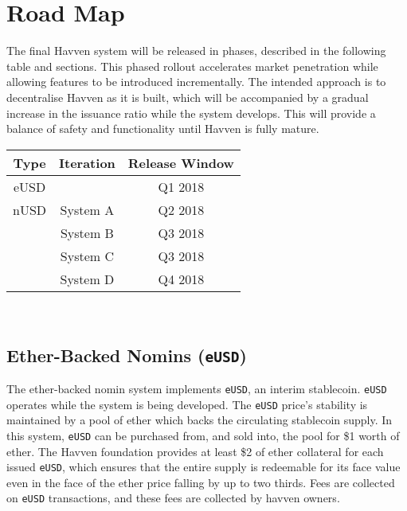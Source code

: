 \section{Road Map}

The final Havven system will be released in phases, described in the following
table and sections. This phased rollout accelerates market penetration while
allowing features to be introduced incrementally. The intended approach  
is to decentralise Havven as it is built, which will be accompanied by a gradual
increase in the issuance ratio while the system develops.
This will provide a balance of safety and functionality until Havven is fully
mature. \\

\vspace{0.5cm}
\renewcommand{\arraystretch}{1.5}
\setlength{\tabcolsep}{20pt}
\begin{centering}
    \begin{tabular}{|c|c|c|}
        \hline
        \textbf{Type} & \textbf{Iteration} & \textbf{Release Window} \\
        \hline
        \hline
        eUSD & & Q1 2018 \\
        \hline
        \hline
        nUSD & System A & Q2 2018 \\ \cline{2-3}
        & System B & Q3 2018 \\ \cline{2-3}
        & System C & Q3 2018 \\ \cline{2-3}
        & System D & Q4 2018 \\
        \hline
    \end{tabular} \\
\end{centering}

\vspace{0.5cm}

\subsection{Ether-Backed Nomins (\texttt{eUSD})}

\noindent The ether-backed nomin system implements \texttt{eUSD}, an interim stablecoin.
\texttt{eUSD} operates while the system is being developed.
The \texttt{eUSD} price's stability is maintained by a pool of ether which
backs the circulating stablecoin supply. In this system, \texttt{eUSD} can be
purchased from, and sold into, the pool for \$1 worth of ether.
The Havven foundation provides at least \$2 of ether collateral for each
issued \texttt{eUSD}, which ensures that the entire supply is redeemable for its
face value even in the face of the ether price falling by up to two thirds.
Fees are collected on \texttt{eUSD} transactions, and these fees are collected
by havven owners. \\

